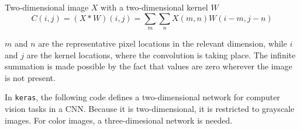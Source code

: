 Two-dimensional image \(X\) with a two-dimensional kernel \(W\) \[
C(i,j) = (X * W)(i,j) = \sum_m \sum_n X(m,n)W(i-m,j-n)
\]

\(m\) and \(n\) are the representative pixel locations in the relevant
dimension, while \(i\) and \(j\) are the kernel locations, where the
convolution is taking place. The infinite summation is made possible by
the fact that values are zero wherever the image is not present.

In \texttt{keras}, the following code defines a two-dimensional network
for computer vision tasks in a CNN. Because it is two-dimensional, it is
restricted to grayscale images. For color images, a three-dimesional
network is needed.

\begin{Shaded}
\begin{Highlighting}[]
\OtherTok{\textless{}{-}} \NormalTok{()}
\SpecialCharTok{\%\textgreater{}\%}
       \NormalTok{(} \NormalTok{,}
                     \NormalTok{(}\NormalTok{,}\NormalTok{),}
                     \NormalTok{,}
                     \NormalTok{(}\NormalTok{,}\NormalTok{,}\NormalTok{)) }\SpecialCharTok{\%\textgreater{}\%}
       \NormalTok{(} \NormalTok{,}
                     \NormalTok{(}\NormalTok{,}\NormalTok{),}
                     \NormalTok{) }\SpecialCharTok{\%\textgreater{}\%}
       \NormalTok{(} \NormalTok{(}\NormalTok{,}\NormalTok{)) }\SpecialCharTok{\%\textgreater{}\%}
       \NormalTok{(} \NormalTok{) }\SpecialCharTok{\%\textgreater{}\%}
       \NormalTok{() }\SpecialCharTok{\%\textgreater{}\%}
       \NormalTok{(} \NormalTok{, } \NormalTok{) }\SpecialCharTok{\%\textgreater{}\%}
       \NormalTok{(} \NormalTok{) }\SpecialCharTok{\%\textgreater{}\%}
       \NormalTok{(} \NormalTok{, } \NormalTok{)}
\end{Highlighting}
\end{Shaded}


